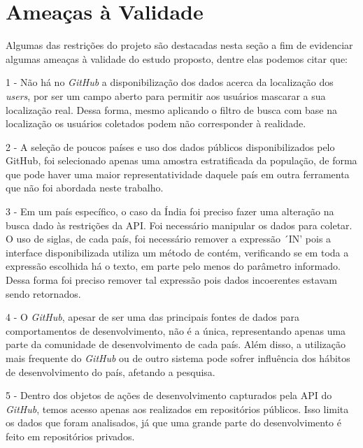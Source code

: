 \documentclass[12pt]{article}
\begin{document}

\section{Ameaças à Validade} \label{sec:threatstovalidity}

Algumas das restrições do projeto são destacadas nesta seção a fim de evidenciar algumas ameaças à validade do estudo proposto, dentre elas podemos citar que:  

1 - Não há no \textit{GitHub} a disponibilização dos dados acerca da localização dos \textit{users}, por ser um campo aberto para permitir aos usuários mascarar a sua localização real. Dessa forma, mesmo aplicando o filtro de busca com base na localização os usuários coletados podem não corresponder à realidade.

2 - A seleção de poucos países e uso dos dados públicos disponibilizados pelo GitHub, foi selecionado apenas uma amostra estratificada da população, de forma que pode haver uma maior representatividade daquele país em outra ferramenta que não foi abordada neste trabalho.

3 - Em um país específico, o caso da Índia foi preciso fazer uma alteração na busca dado às restrições da API. Foi necessário manipular os dados para coletar. O uso de siglas, de cada país, foi necessário remover a expressão ´IN' pois a interface disponibilizada utiliza um método de contém, verificando se em toda a expressão escolhida há o texto, em parte pelo menos do parâmetro informado. Dessa forma foi preciso remover tal expressão pois dados incoerentes estavam sendo retornados.

4 - O \textit{GitHub}, apesar de ser uma das principais fontes de dados para comportamentos de desenvolvimento, não é a única, representando apenas uma parte da comunidade de desenvolvimento de cada país. Além disso, a utilização mais frequente do \textit{GitHub} ou de outro sistema pode sofrer influência dos hábitos de desenvolvimento do país, afetando a pesquisa.

5 - Dentro dos objetos de ações de desenvolvimento capturados pela API do \textit{GitHub}, temos acesso apenas aos realizados em repositórios públicos. Isso limita os dados que foram analisados, já que uma grande parte do desenvolvimento é feito em repositórios privados.
\end{document}
